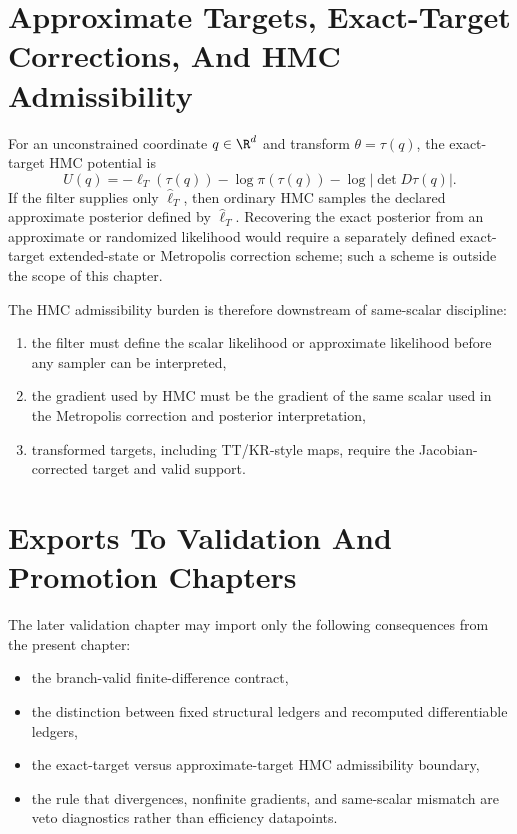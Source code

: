 \section{Approximate Targets, Exact-Target Corrections, And HMC Admissibility}
\label{sec:bf-hd-fixed-branch-hmc}

For an unconstrained coordinate \(q\in\R^d\) and transform
\(\theta=\tau(q)\), the exact-target HMC potential is
\begin{equation}
  U(q)
  =
  -\ell_T(\tau(q))-
  \log \pi(\tau(q))-
  \log\left|\det D\tau(q)\right|.
  \label{eq:bf-hd-hmc-potential-live}
\end{equation}
If the filter supplies only \(\widehat\ell_T\), then ordinary HMC samples the
declared approximate posterior defined by \(\widehat\ell_T\).  Recovering the
exact posterior from an approximate or randomized likelihood would require a
separately defined exact-target extended-state or Metropolis correction scheme;
such a scheme is outside the scope of this chapter.

The HMC admissibility burden is therefore downstream of same-scalar discipline:
\begin{enumerate}[label=(\arabic*), leftmargin=0.28in]
  \item the filter must define the scalar likelihood or approximate likelihood
  before any sampler can be interpreted,
  \item the gradient used by HMC must be the gradient of the same scalar used in
  the Metropolis correction and posterior interpretation,
  \item transformed targets, including TT/KR-style maps, require the
  Jacobian-corrected target and valid support.
\end{enumerate}

\section{Exports To Validation And Promotion Chapters}
\label{sec:bf-hd-fixed-branch-exports}

The later validation chapter may import only the following consequences from the
present chapter:
\begin{itemize}[leftmargin=0.28in]
  \item the branch-valid finite-difference contract,
  \item the distinction between fixed structural ledgers and recomputed
  differentiable ledgers,
  \item the exact-target versus approximate-target HMC admissibility boundary,
  \item the rule that divergences, nonfinite gradients, and same-scalar mismatch
  are veto diagnostics rather than efficiency datapoints.
\end{itemize}

